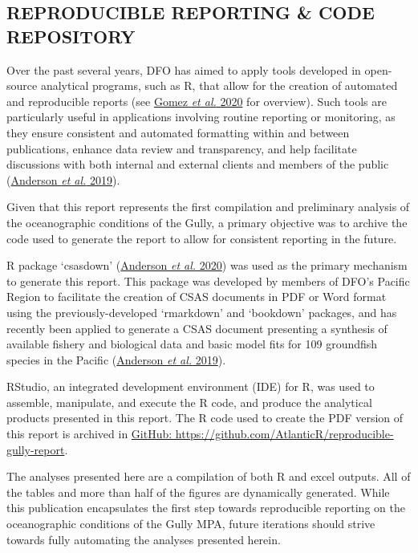 \documentclass[12pt]{article}\usepackage[]{graphicx}\usepackage[]{color}
\begin{document}
\hypertarget{reproducible-reporting-code-repository}{%
\subsection{\texorpdfstring{\textbf{REPRODUCIBLE REPORTING \& CODE REPOSITORY}}{REPRODUCIBLE REPORTING \& CODE REPOSITORY}}\label{reproducible-reporting-code-repository}}

Over the past several years, DFO has aimed to apply tools developed in open-source analytical programs, such as R, that allow for the creation of automated and reproducible reports (see \protect\hyperlink{ref-gomez_2020}{Gomez \textit{et al.} 2020} for overview). Such tools are particularly useful in applications involving routine reporting or monitoring, as they ensure consistent and automated formatting within and between publications, enhance data review and transparency, and help facilitate discussions with both internal and external clients and members of the public (\protect\hyperlink{ref-anderson_2019}{Anderson \textit{et al.} 2019}).

Given that this report represents the first compilation and preliminary analysis of the oceanographic conditions of the Gully, a primary objective was to archive the code used to generate the report to allow for consistent reporting in the future.

R package `csasdown' (\protect\hyperlink{ref-anderson_2020}{Anderson \textit{et al.} 2020}) was used as the primary mechanism to generate this report. This package was developed by members of DFO's Pacific Region to facilitate the creation of CSAS documents in PDF or Word format using the previously-developed `rmarkdown' and `bookdown' packages, and has recently been applied to generate a CSAS document presenting a synthesis of available fishery and biological data and basic model fits for 109 groundfish species in the Pacific (\protect\hyperlink{ref-anderson_2019}{Anderson \textit{et al.} 2019}).

RStudio, an integrated development environment (IDE) for R, was used to assemble, manipulate, and execute the R code, and produce the analytical products presented in this report. The R code used to create the PDF version of this report is archived in \href{https://github.com/AtlanticR/reproducible-gully-report}{GitHub: https://github.com/AtlanticR/reproducible-gully-report}.

The analyses presented here are a compilation of both R and excel outputs. All of the tables and more than half of the figures are dynamically generated. While this publication encapsulates the first step towards reproducible reporting on the oceanographic conditions of the Gully MPA, future iterations should strive towards fully automating the analyses presented herein.
\end{document}
